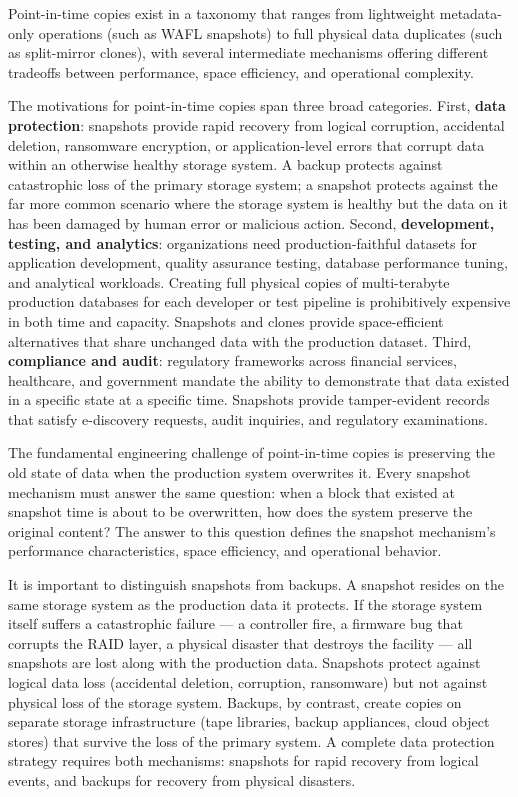 Point-in-time copies exist in a taxonomy that ranges from lightweight metadata-only operations (such as WAFL snapshots) to full physical data duplicates (such as split-mirror clones), with several intermediate mechanisms offering different tradeoffs between performance, space efficiency, and operational complexity.

The motivations for point-in-time copies span three broad categories. First, \textbf{data protection}: snapshots provide rapid recovery from logical corruption, accidental deletion, ransomware encryption, or application-level errors that corrupt data within an otherwise healthy storage system. A backup protects against catastrophic loss of the primary storage system; a snapshot protects against the far more common scenario where the storage system is healthy but the data on it has been damaged by human error or malicious action. Second, \textbf{development, testing, and analytics}: organizations need production-faithful datasets for application development, quality assurance testing, database performance tuning, and analytical workloads. Creating full physical copies of multi-terabyte production databases for each developer or test pipeline is prohibitively expensive in both time and capacity. Snapshots and clones provide space-efficient alternatives that share unchanged data with the production dataset. Third, \textbf{compliance and audit}: regulatory frameworks across financial services, healthcare, and government mandate the ability to demonstrate that data existed in a specific state at a specific time. Snapshots provide tamper-evident records that satisfy e-discovery requests, audit inquiries, and regulatory examinations.

The fundamental engineering challenge of point-in-time copies is preserving the old state of data when the production system overwrites it. Every snapshot mechanism must answer the same question: when a block that existed at snapshot time is about to be overwritten, how does the system preserve the original content? The answer to this question defines the snapshot mechanism's performance characteristics, space efficiency, and operational behavior.

It is important to distinguish snapshots from backups. A snapshot resides on the same storage system as the production data it protects. If the storage system itself suffers a catastrophic failure --- a controller fire, a firmware bug that corrupts the RAID layer, a physical disaster that destroys the facility --- all snapshots are lost along with the production data. Snapshots protect against logical data loss (accidental deletion, corruption, ransomware) but not against physical loss of the storage system. Backups, by contrast, create copies on separate storage infrastructure (tape libraries, backup appliances, cloud object stores) that survive the loss of the primary system. A complete data protection strategy requires both mechanisms: snapshots for rapid recovery from logical events, and backups for recovery from physical disasters.

